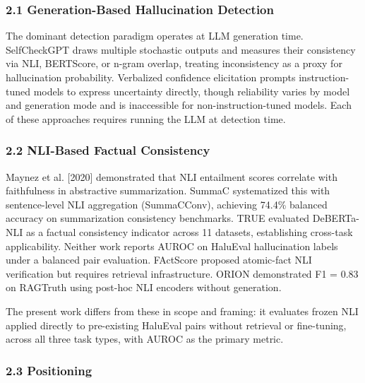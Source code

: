 
\subsubsection{2.1 Generation-Based Hallucination Detection}

The dominant detection paradigm operates at LLM generation time. SelfCheckGPT \citep{Manakul2023SelfCheckGPT} draws multiple stochastic outputs and measures their consistency via NLI, BERTScore, or n-gram overlap, treating inconsistency as a proxy for hallucination probability. Verbalized confidence elicitation \citep{Kadavath2022Language} prompts instruction-tuned models to express uncertainty directly, though reliability varies by model and generation mode and is inaccessible for non-instruction-tuned models. Each of these approaches requires running the LLM at detection time.

\subsubsection{2.2 NLI-Based Factual Consistency}

Maynez et al. [2020] demonstrated that NLI entailment scores correlate with faithfulness in abstractive summarization. SummaC \citep{Laban2022SummaC} systematized this with sentence-level NLI aggregation (SummaCConv), achieving 74.4\% balanced accuracy on summarization consistency benchmarks. TRUE \citep{Honovich2022TRUE} evaluated DeBERTa-NLI as a factual consistency indicator across 11 datasets, establishing cross-task applicability. Neither work reports AUROC on HaluEval hallucination labels under a balanced pair evaluation. FActScore \citep{Min2023FActScore} proposed atomic-fact NLI verification but requires retrieval infrastructure. ORION \citep{Gerner2025ORION} demonstrated F1 = 0.83 on RAGTruth using post-hoc NLI encoders without generation.

The present work differs from these in scope and framing: it evaluates frozen NLI applied directly to pre-existing HaluEval pairs without retrieval or fine-tuning, across all three task types, with AUROC as the primary metric.

\subsubsection{2.3 Positioning}

\begin{table}[htbp]
\centering
{}
\end{table}

